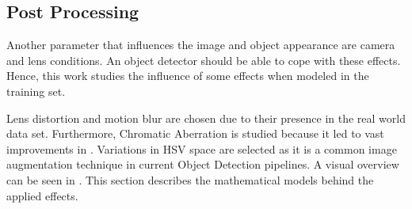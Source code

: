 \subsection{Post Processing}
\label{sec:postprocessing}
Another parameter that influences the image and object appearance are camera and lens conditions. An object detector should be able to cope with these effects. Hence, this work studies the influence of some effects when modeled in the training set.

Lens distortion and motion blur are chosen due to their presence in the real world data set. Furthermore, Chromatic Aberration is studied because it led to vast improvements in \cite{Carlson2018}. Variations in \ac{HSV} space are selected as it is a common image augmentation technique in current Object Detection pipelines. A visual overview can be seen in . This section describes the mathematical models behind the applied effects.

